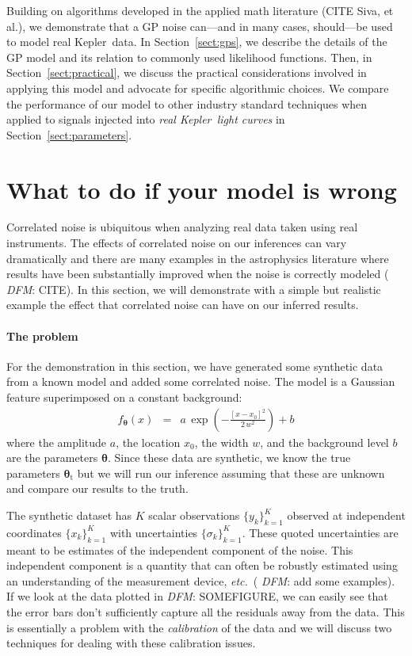 \documentclass[12pt,preprint]{aastex}
\newcommand{\project}[1]{{\sffamily #1}}
\newcommand{\kepler}{\project{Kepler}}
\newcommand{\foreign}[1]{\emph{#1}}
\newcommand{\etc}{\foreign{etc.}}
\newcommand{\eqlabel}[1]{\label{eq:#1}}
\newcommand{\Sect}[1]{Section~\ref{sect:#1}}
\newcommand{\sect}[1]{\Sect{#1}}
\newcommand{\sectlabel}[1]{\label{sect:#1}}
\newcommand{\bvec}[1]{{\ensuremath{\boldsymbol{#1}}}}
\newcommand{\todo}[3]{{\color{#2} \emph{#1}: #3}}
\newcommand{\dfmtodo}[1]{\todo{DFM}{red}{#1}}
\begin{document}
Building on algorithms developed in the applied math literature (CITE Siva, et
al.), we demonstrate that a GP noise can---and in many cases, should---be
used to model real \kepler\ data.
In \sect{gps}, we describe the details of the GP model and its relation to
commonly used likelihood functions.
Then, in \sect{practical}, we discuss the practical considerations involved in
applying this model and advocate for specific algorithmic choices.
We compare the performance of our model to other industry standard techniques
when applied to signals injected into \emph{real \kepler\ light curves} in
\sect{parameters}.

\section{What to do if your model is wrong}
\sectlabel{corr-noise}

Correlated noise is ubiquitous when analyzing real data taken using real
instruments.
The effects of correlated noise on our inferences can vary dramatically and
there are many examples in the astrophysics literature where results have been
substantially improved when the noise is correctly modeled (\dfmtodo{CITE}).
In this section, we will demonstrate with a simple but realistic example the
effect that correlated noise can have on our inferred results.

\paragraph{The problem}

For the demonstration in this section, we have generated some synthetic data
from a known model and added some correlated noise.
The model is a Gaussian feature superimposed on a constant background:
\begin{eqnarray}\eqlabel{demo-base-model}
f_\bvec{\theta}(x) &=& a\,\exp\left(-\frac{[x - x_0]^2}{2\,w^2}\right) + b
\end{eqnarray}
where the amplitude $a$, the location $x_0$, the width $w$, and the background
level $b$ are the parameters \bvec{\theta}.
Since these data are synthetic, we know the true parameters
$\bvec{\theta}_\mathrm{t}$ but we will run our inference assuming that
these are unknown and compare our results to the truth.

The synthetic dataset has $K$ scalar observations $\{y_k\}_{k=1}^K$ observed
at independent coordinates $\{x_k\}_{k=1}^K$ with uncertainties
$\{\sigma_k\}_{k=1}^K$.
These quoted uncertainties are meant to be estimates of the independent
component of the noise.
This independent component is a quantity that can often be robustly estimated
using an understanding of the measurement device, \etc\ (\dfmtodo{add some
examples}).
If we look at the data plotted in \dfmtodo{SOMEFIGURE}, we can easily see that
the error bars don't sufficiently capture all the residuals away from the
data.
This is essentially a problem with the \emph{calibration} of the data and
we will discuss two techniques for dealing with these calibration issues.
\end{document}
